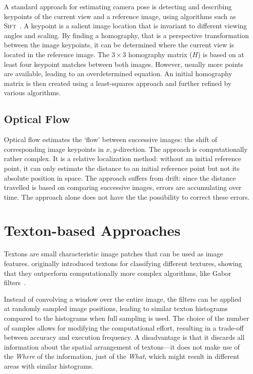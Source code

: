 A standard approach for estimating camera pose is detecting and
describing keypoints of the current view and a reference image, using
algorithms such as \textsc{Sift}~\cite{lowe1999object}. A
keypoint is a salient image location that is invariant to different
viewing angles and scaling. By finding a homography, that is a perspective transformation between the image keypoints, it can be determined where
the current view is located in the reference image. The $3 \times 3$
homography matrix ($H$) is based on at least four keypoint matches
between both images. However, usually more points are available,
leading to an overdetermined equation. An initial homography matrix is
then created using a least-squares approach and further refined by
various algorithms.



\subsection{Optical Flow}
\label{sec:opticalflow}

Optical flow estimates the ‘flow’ between successive images: the shift of corresponding image keypoints in $x,y$-direction.
The approach is computationally rather complex. It is a relative localization method: without an initial reference point, it can only estimate the distance to an initial reference point but not its absolute position in space. The approach suffers from drift: since the distance travelled is based on comparing successive images, errors are accumulating over time. The approach alone does not have the  the possibility to correct these errors.


\section{Texton-based Approaches}
\label{sec:textonbasedapproaches}

Textons are small characteristic image patches that can be used as image features.
\citeauthor{varma2005statistical} originally introduced textons for
classifying different textures, showing that they outperform
computationally more complex algorithms, like Gabor
filters~\cite{varma2005statistical}.

Instead of convolving a window over the entire image, the filters can be applied at randomly sampled image positions, leading to similar texton histograms compared to the histograms when full sampling is used. The choice of the number of samples allows for modifying the computational effort, resulting in a
trade-off between accuracy and execution frequency. A disadvantage is
that it discards all information about the spatial arrangement of
textons---it does not make use of the \emph{Where} of the information,
just of the \emph{What}, which might result in different areas with
similar histograms.

